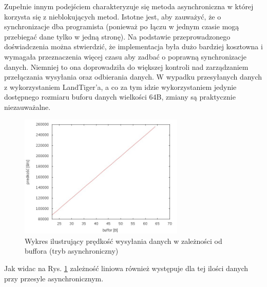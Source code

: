 \documentclass{BscUS}
\begin{document}
\newline
\indent Zupełnie innym podejściem charakteryzuje się metoda asynchroniczna w której korzysta się z nieblokujących metod. Istotne jest, aby zauważyć, że o synchronizacje dba programista (ponieważ po łączu w jednym czasie mogą przebiegać dane tylko w jedną stronę). Na podstawie przeprowadzonego doświadczenia można stwierdzić, że implementacja była dużo bardziej kosztowna i wymagała przeznaczenia więcej czasu aby zadbać o poprawną synchronizacje danych. Niemniej to ona doprowadziła do większej kontroli nad zarządzaniem przełączania wysyłania oraz odbierania danych. W wypadku przesyłanych danych z wykorzystaniem LandTiger'a, a co za tym idzie wykorzystaniem jedynie dostępnego rozmiaru buforu danych wielkości 64B, zmiany są praktycznie niezauważalne.
\begin{figure}[H]
{
\centering
\includegraphics[width=0.7\textwidth]{./img/A_107374200Send}
\caption{Wykres ilustrujący prędkość wysyłania danych w zależności od buffora (tryb asynchroniczny)}
\label{fig:A_107374200Send}
}

\end{figure}

\noindent Jak widac na Rys. \ref{fig:A_107374200Send} zależność liniowa również występuje dla tej ilości danych przy przesyle asynchronicznym.
\end{document}
